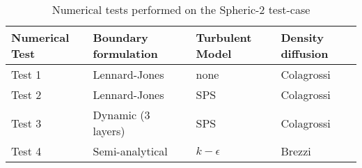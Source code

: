 \documentclass{../GPUSPHtemplate}
\begin{document}
\begin{itemize}
  \begin{table}[h]\caption{Numerical tests performed on the Spheric-2 test-case}
    \label{tab:spheric2-setup}
    \begin{tabular}{ |p{3cm}|p{4cm}|p{3.5cm}|p{3cm}|  } 
      \hline
      Numerical Test & Boundary formulation & Turbulent Model & Density diffusion \\
      \hline
      Test 1 & Lennard-Jones      & none         & Colagrossi \\
      Test 2 & Lennard-Jones      & SPS          & Colagrossi \\
      Test 3 & Dynamic (3 layers) & SPS          & Colagrossi \\
      Test 4 & Semi-analytical    & $k-\epsilon$ & Brezzi \\
      \hline
    \end{tabular}
  \end{table}
\end{itemize}
\end{document}
